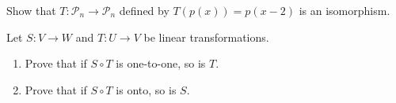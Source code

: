 \documentclass[11pt,letterpaper,boxed]{hmcpset}
\begin{document}
\begin{solution}
\vfill
\end{solution}
\newpage

\begin{problem}[Poole 6.5 \#28]
Show that $T: \mathcal{P}_n \rightarrow \mathcal{P}_n$ defined by $T(p(x)) = p(x-2)$ is an isomorphism.
\end{problem}

\begin{solution}
\vfill
\end{solution}
\newpage

\begin{problem}[Poole 6.5 \#34]
Let $S: V\rightarrow W$ and $T: U \rightarrow V$ be linear transformations.
\begin{enumerate}
\item Prove that if $S \circ T$ is one-to-one, so is $T$.
\item Prove that if $S \circ T$ is onto, so is $S$.
\end{enumerate}
\end{problem}

\begin{solution}
\vfill
\end{solution}
\end{document}
